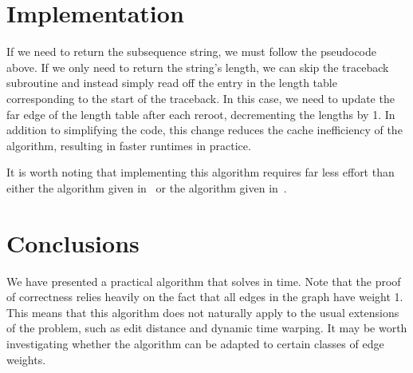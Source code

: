 \documentclass{article}
\begin{document}
\section{Implementation}

If we need to return the subsequence string, we must follow the pseudocode above.  If we only need to return the string's length, we can skip the traceback subroutine and instead simply read off the entry in the length table corresponding to the start of the traceback.  In this case, we need to update the far edge of the length table after each reroot, decrementing the lengths by 1.  In addition to simplifying the code, this change reduces the cache inefficiency of the algorithm, resulting in faster runtimes in practice.

It is worth noting that implementing this algorithm requires far less effort than either the  algorithm given in~\cite{M90} or the  algorithm given in~\cite{LMS98}.

\section{Conclusions}

We have presented a practical algorithm that solves  in  time.  Note that the proof of correctness relies heavily on the fact that all edges in the graph have weight 1.  This means that this algorithm does not naturally apply to the usual extensions of the problem, such as edit distance and dynamic time warping.  It may be worth investigating whether the algorithm can be adapted to certain classes of edge weights.


\end{document}
